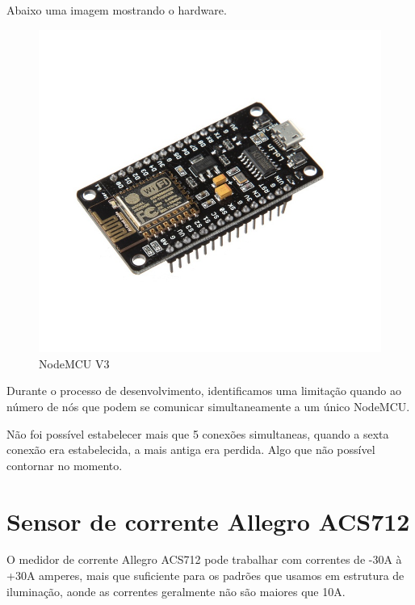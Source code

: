 \documentclass[openright]{normas-utf-tex} %
\begin{document}
Abaixo uma imagem mostrando o hardware.

\begin{figure}[h!b]
\centering 
\includegraphics[scale=0.5]{nodemcu.jpg}
\caption{NodeMCU V3}
\label{NodeMCU}
\end{figure}

Durante o processo de desenvolvimento, identificamos uma limitação quando ao número de nós que podem se comunicar simultaneamente a um único NodeMCU. 

Não foi possível estabelecer mais que 5 conexões simultaneas, quando a sexta conexão era estabelecida, a mais antiga era perdida. Algo que não possível contornar no momento.

\section{Sensor de corrente Allegro ACS712}
O medidor de corrente Allegro ACS712  \cite{Allegro} pode trabalhar com correntes de -30A à +30A   \cite{Allegro} amperes, mais que suficiente para os padrões que usamos em estrutura de iluminação, aonde as correntes geralmente não são maiores que 10A.
\end{document}
